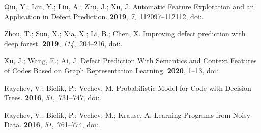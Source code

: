 \documentclass[mathematics,review,accept,moreauthors,pdftex]{Definitions/mdpi}
\begin{document}
\begin{thebibliography}{999}
{Qiu}, Y.; {Liu}, Y.; {Liu}, A.; {Zhu}, J.; {Xu}, J.
\newblock Automatic Feature Exploration and an Application in Defect
  Prediction.
 {\bf 2019}, {\em 7},~112097--112112,
\newblock
  doi:{\href{https://doi.org/10.1109/ACCESS.2019.2934530}{}}.

Zhou, T.; Sun, X.; Xia, X.; Li, B.; Chen, X.
\newblock Improving defect prediction with deep forest.
 {\bf 2019}, {\em
  114},~204--216,
\newblock
  doi:{\href{https://doi.org/https://doi.org/10.1016/j.infsof.2019.07.003}{}}.

{Xu}, J.; {Wang}, F.; {Ai}, J.
\newblock Defect Prediction With Semantics and Context Features of Codes Based
  on Graph Representation Learning.
 {\bf 2020}, 1--13,
\newblock
  doi:{\href{https://doi.org/10.1109/TR.2020.3040191}{}}.


Raychev, V.; Bielik, P.; Vechev, M.
\newblock Probabilistic Model for Code with Decision Trees.
 {\bf 2016}, {\em 51},~731–747,
\newblock
  doi:{\href{https://doi.org/10.1145/3022671.2984041}{}}.

Raychev, V.; Bielik, P.; Vechev, M.; Krause, A.
\newblock Learning Programs from Noisy Data.
 {\bf 2016}, {\em 51},~761--774,
\newblock
  doi:{\href{https://doi.org/10.1145/2914770.2837671}{}}.


\end{thebibliography}
\end{document}
